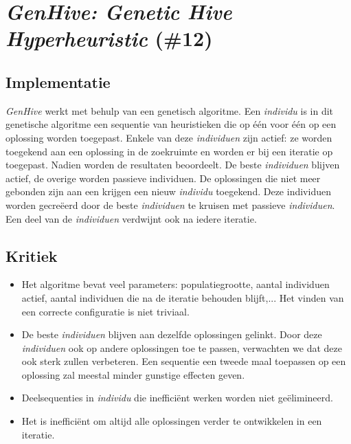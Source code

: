 \section{\emph{GenHive: Genetic Hive Hyperheuristic} (\#12)}

\subsection{Implementatie}
\emph{GenHive}\cite{chesc-genhive} werkt met behulp van een genetisch algoritme. Een \emph{individu} is in dit genetische algoritme een sequentie van heuristieken die op \'e\'en voor \'e\'en op een oplossing worden toegepast. Enkele van deze \emph{individuen} zijn actief: ze worden toegekend aan een oplossing in de zoekruimte en worden er bij een iteratie op toegepast. Nadien worden de resultaten beoordeelt. De beste \emph{individuen} blijven actief, de overige worden passieve individuen. De oplossingen die niet meer gebonden zijn aan een \abh{} krijgen een nieuw \emph{individu} toegekend. Deze individuen worden gecre\"eerd door de beste \emph{individuen} te kruisen met passieve \emph{individuen}. Een deel van de \emph{individuen} verdwijnt ook na iedere iteratie.

\subsection{Kritiek}
\begin{itemize}
 \item Het algoritme bevat veel parameters: populatiegrootte, aantal individuen actief, aantal individuen die na de iteratie behouden blijft,... Het vinden van een correcte configuratie is niet triviaal.
 \item De beste \emph{individuen} blijven aan dezelfde oplossingen gelinkt. Door deze \emph{individuen} ook op andere oplossingen toe te passen, verwachten we dat deze ook sterk zullen verbeteren. Een sequentie een tweede maal toepassen op een oplossing zal meestal minder gunstige effecten geven.
 \item Deelsequenties in \emph{individu} die ineffici\"ent werken worden niet ge\"elimineerd.
 \item Het is ineffici\"ent om altijd alle oplossingen verder te ontwikkelen in een iteratie.
\end{itemize}